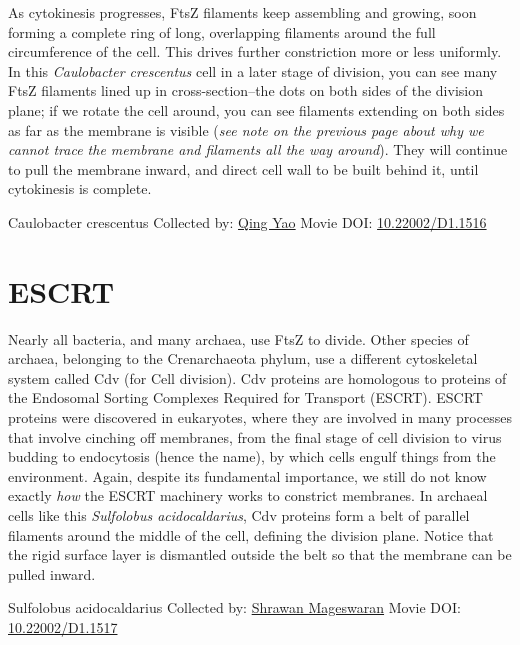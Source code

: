 \documentclass[]{tufte-book}
\begin{document}
As cytokinesis progresses, FtsZ filaments keep assembling and growing, soon forming a complete ring of long, overlapping filaments around the full circumference of the cell. This drives further constriction more or less uniformly. In this \emph{Caulobacter crescentus} cell in a later stage of division, you can see many FtsZ filaments lined up in cross-section--the dots on both sides of the division plane; if we rotate the cell around, you can see filaments extending on both sides as far as the membrane is visible (\emph{see note on the previous page about why we cannot trace the membrane and filaments all the way around}). They will continue to pull the membrane inward, and direct cell wall to be built behind it, until cytokinesis is complete.



\hypertarget{htmlwidget-c8d78b6ed08f76feece9}{}

\label{fig:5-10}Caulobacter crescentus Collected by: \protect\hyperlink{qing_yao}{Qing Yao} Movie DOI: \href{https://doi.org/10.22002/D1.1516}{10.22002/D1.1516}

\hypertarget{escrt}{%
\section{ESCRT}\label{escrt}}

Nearly all bacteria, and many archaea, use FtsZ to divide. Other species of archaea, belonging to the Crenarchaeota phylum, use a different cytoskeletal system called Cdv (for Cell division). Cdv proteins are homologous to proteins of the Endosomal Sorting Complexes Required for Transport (ESCRT). ESCRT proteins were discovered in eukaryotes, where they are involved in many processes that involve cinching off membranes, from the final stage of cell division to virus budding to endocytosis (hence the name), by which cells engulf things from the environment. Again, despite its fundamental importance, we still do not know exactly \emph{how} the ESCRT machinery works to constrict membranes. In archaeal cells like this \emph{Sulfolobus acidocaldarius}, Cdv proteins form a belt of parallel filaments around the middle of the cell, defining the division plane. Notice that the rigid surface layer is dismantled outside the belt so that the membrane can be pulled inward.



\hypertarget{htmlwidget-e10457d46e437b3b8185}{}

\label{fig:5-11}Sulfolobus acidocaldarius Collected by: \protect\hyperlink{shrawan_mageswaran}{Shrawan Mageswaran} Movie DOI: \href{https://doi.org/10.22002/D1.1517}{10.22002/D1.1517}
\end{document}
